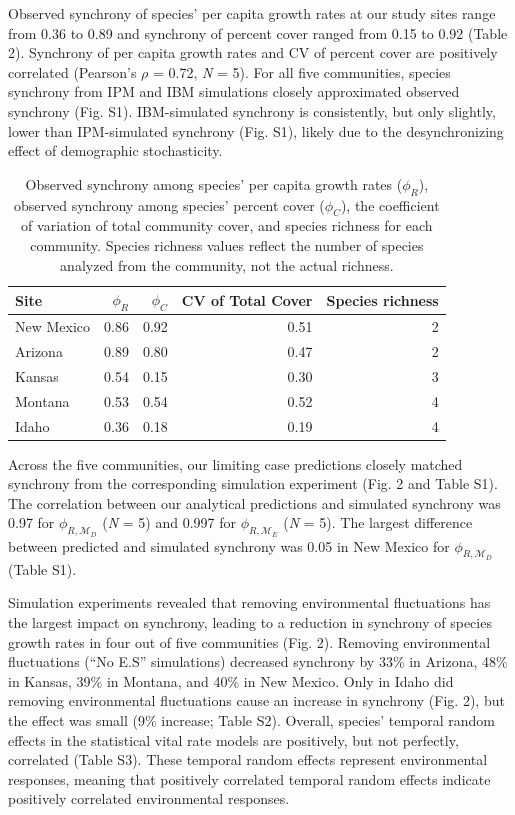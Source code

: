\documentclass[12pt,]{article}
\begin{document}
Observed synchrony of species' per capita growth rates
at our study sites range from 0.36 to 0.89 and synchrony of percent
cover ranged from 0.15 to 0.92 (Table 2). Synchrony of per capita growth
rates and CV of percent cover are positively correlated (Pearson's
\(\rho\) = 0.72, \emph{N} = 5). For all five communities, species
synchrony from IPM and IBM simulations closely approximated observed
synchrony (Fig. S1). IBM-simulated synchrony is consistently, but only
slightly, lower than IPM-simulated synchrony (Fig. S1), likely due to
the desynchronizing effect of demographic stochasticity.

\begin{table}[ht]
\centering
\caption{Observed synchrony among species' per capita growth rates ($\phi_{R}$), observed synchrony among species' percent cover ($\phi_{C}$), the coefficient of variation of total community cover, and species richness for each community. Species richness values reflect the number of species analyzed from the community, not the actual richness.} 
\begingroup\normalsize
\begin{tabular}{lrrrr}
  \hline
Site & $\phi_{R}$ & $\phi_{C}$ & CV of Total Cover & Species richness \\ 
  \hline
New Mexico & 0.86 & 0.92 & 0.51 &   2 \\ 
  Arizona & 0.89 & 0.80 & 0.47 &   2 \\ 
  Kansas & 0.54 & 0.15 & 0.30 &   3 \\ 
  Montana & 0.53 & 0.54 & 0.52 &   4 \\ 
  Idaho & 0.36 & 0.18 & 0.19 &   4 \\ 
   \hline
\end{tabular}
\endgroup
\end{table}

Across the five communities, our limiting case predictions closely
matched synchrony from the corresponding simulation experiment (Fig. 2
and Table S1). The correlation between our analytical predictions and
simulated synchrony was 0.97 for \(\phi_{R,\mathcal{M}_D}\) (\emph{N} =
5) and 0.997 for \(\phi_{R,\mathcal{M}_E}\) (\emph{N} = 5). The largest
difference between predicted and simulated synchrony was 0.05 in New
Mexico for \(\phi_{R,\mathcal{M}_D}\) (Table S1).

Simulation experiments revealed that removing environmental fluctuations
has the largest impact on synchrony, leading to a reduction in synchrony
of species growth rates in four out of five communities (Fig. 2).
Removing environmental fluctuations (``No E.S'' simulations) decreased
synchrony by 33\% in Arizona, 48\% in Kansas, 39\% in Montana, and 40\%
in New Mexico. Only in Idaho did removing environmental fluctuations
cause an increase in synchrony (Fig. 2), but the effect was small (9\%
increase; Table S2). Overall, species' temporal random effects in the
statistical vital rate models are positively, but not perfectly,
correlated (Table S3).
These temporal random effects represent environmental responses, meaning that positively correlated temporal random effects indicate positively correlated environmental responses.
\end{document}
